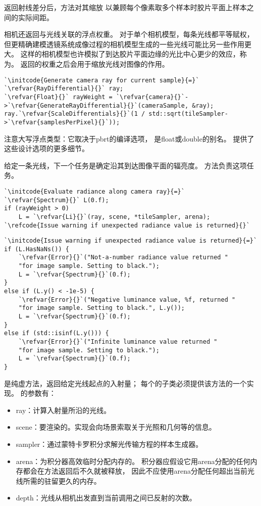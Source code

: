 返回射线差分后，方法对其缩放
以兼顾每个像素取多个样本时胶片平面上样本之间的实际间距。

相机还返回与光线关联的浮点权重。
对于单个相机模型，每条光线都平等赋权，
但更精确建模透镜系统成像过程的相机模型生成的一些光线可能比另一些作用更大。
这样的相机模型也许模拟了到达胶片平面边缘的光比中心更少的效应，称为。
返回的权重之后会用于缩放光线对图像的作用。
\begin{lstlisting}
`\initcode{Generate camera ray for current sample}{=}`
`\refvar{RayDifferential}{}` ray;
`\refvar{Float}{}` rayWeight = `\refvar{camera}{}`->`\refvar{GenerateRayDifferential}{}`(cameraSample, &ray);
ray.`\refvar{ScaleDifferentials}{}`(1 / std::sqrt(tileSampler->`\refvar{samplesPerPixel}{}`));
\end{lstlisting}

注意大写浮点类型：它取决于pbrt的编译选项，
是{\ttfamily float}或{\ttfamily double}的别名。
提供了这些设计选项的更多细节。

给定一条光线，下一个任务是确定沿其到达图像平面的辐亮度。
方法负责这项任务。
\begin{lstlisting}
`\initcode{Evaluate radiance along camera ray}{=}`
`\refvar{Spectrum}{}` L(0.f);
if (rayWeight > 0)
    L = `\refvar{Li}{}`(ray, scene, *tileSampler, arena);
`\refcode{Issue warning if unexpected radiance value is returned}{}`
\end{lstlisting}
\begin{lstlisting}
`\initcode{Issue warning if unexpected radiance value is returned}{=}`
if (L.HasNaNs()) {
    `\refvar{Error}{}`("Not-a-number radiance value returned "
    "for image sample. Setting to black.");
    L = `\refvar{Spectrum}{}`(0.f);
}
else if (L.y() < -1e-5) {
    `\refvar{Error}{}`("Negative luminance value, %f, returned "
    "for image sample. Setting to black.", L.y());
    L = `\refvar{Spectrum}{}`(0.f);
}
else if (std::isinf(L.y())) {
    `\refvar{Error}{}`("Infinite luminance value returned "
    "for image sample. Setting to black.");
    L = `\refvar{Spectrum}{}`(0.f);
}
\end{lstlisting}
是纯虚方法，返回给定光线起点的入射量；
每个的子类必须提供该方法的一个实现。
的参数有：
\begin{itemize}
    \item {\ttfamily ray}：计算入射量所沿的光线。
    \item {\ttfamily scene}：要渲染的。实现会向场景索取关于光照和几何等的信息。
    \item {\ttfamily sampler}：通过蒙特卡罗积分求解光传输方程的样本生成器。
    \item {\ttfamily arena}：为积分器高效临时分配内存的。
          积分器应假设它用{\ttfamily arena}分配的任何内存都会在方法返回后不久就被释放，
          因此不应使用{\ttfamily arena}分配任何超出当前光线所需的驻留更久的内存。
    \item {\ttfamily depth}：光线从相机出发直到当前调用之间已反射的次数。
\end{itemize}

